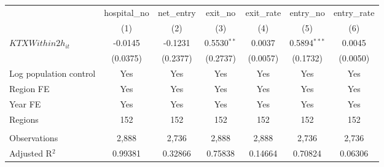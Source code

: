 \begingroup
\centering
\begin{tabular}{lcccccc}
   \toprule
                          & hospital\_no  & net\_entry  & exit\_no      & exit\_rate  & entry\_no      & entry\_rate \\    
                          & (1)           & (2)         & (3)           & (4)         & (5)            & (6)\\  
   \midrule 
   $KTXWithin2h_{it}$     & -0.0145       & -0.1231     & 0.5530$^{**}$ & 0.0037      & 0.5894$^{***}$ & 0.0045\\   
                          & (0.0375)      & (0.2377)    & (0.2737)      & (0.0057)    & (0.1732)       & (0.0050)\\   
   Log population control & Yes           & Yes         & Yes           & Yes         & Yes            & Yes\\  
   Region FE              & Yes           & Yes         & Yes           & Yes         & Yes            & Yes\\  
   Year FE                & Yes           & Yes         & Yes           & Yes         & Yes            & Yes\\  
   Regions                & 152           & 152         & 152           & 152         & 152            & 152\\  
    \\
   Observations           & 2,888         & 2,736       & 2,888         & 2,888       & 2,736          & 2,736\\  
   Adjusted R$^2$         & 0.99381       & 0.32866     & 0.75838       & 0.14664     & 0.70824        & 0.06306\\  
   \bottomrule
\end{tabular}
\par\endgroup
